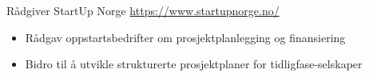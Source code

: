 \documentclass[a4paper, serif, 10pt]{moderncv}
\begin{document}
        {Rådgiver}
        {StartUp Norge}
        {\url{https://www.startupnorge.no/}}
        {}
        {\begin{itemize}
\item Rådgav oppstartsbedrifter om prosjektplanlegging og finansiering
\item Bidro til å utvikle strukturerte prosjektplaner for tidligfase-selskaper
\end{itemize}}
    
\end{document}
